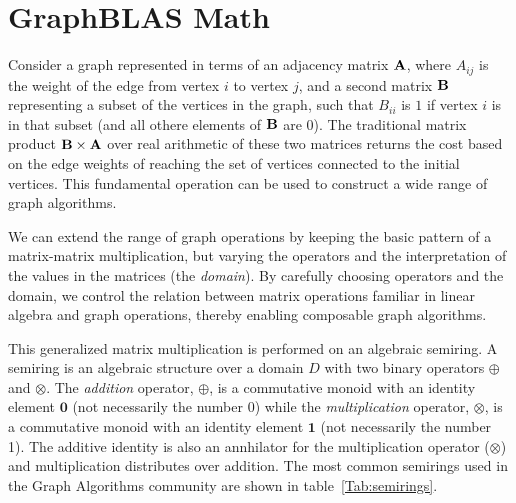 \section{GraphBLAS Math}
\label{sec:math}

Consider a graph represented in terms of an adjacency matrix ${\bf A}$,
where $A_{ij}$ is the weight of the edge from vertex $i$ to vertex $j$,
and a second matrix ${\bf B}$ representing a subset of the vertices
in the graph, such that $B_{ii}$ is $1$ if vertex $i$ is in that subset
(and all othere elements of ${\bf B}$ are 0).  The traditional matrix
product ${\bf B} \times {\bf A}$ over real arithmetic of these two matrices returns the cost
based on the edge weights of reaching the set of vertices
connected to the initial vertices.   This fundamental operation can be
used to construct a wide range of graph algorithms.

We can extend the range of graph operations by keeping the basic
pattern of a matrix-matrix multiplication, but varying
the operators and the interpretation of the values in the matrices (the \emph{domain}).
By carefully choosing operators and the domain, we control the
relation between matrix operations familiar in linear algebra and graph operations, thereby enabling
composable graph algorithms.

This generalized matrix multiplication is performed on an algebraic semiring.   
A semiring is an algebraic
structure over a domain $D$ with two binary operators $\oplus$ and $\otimes$.
The \emph{addition} operator, $\oplus$, is a commutative monoid with an identity 
element $\mathbf{0}$ (not necessarily the number 0)
while the \emph{multiplication} operator, $\otimes$, is a commutative monoid with an 
identity element $\mathbf{1}$ (not necessarily the number 1).  The additive 
identity is also an annhilator for the multiplication 
operator ($\otimes$) and multiplication distributes over addition.  The most 
common semirings used in the Graph Algorithms community are 
shown in table~\ref{Tab:semirings}.
  
